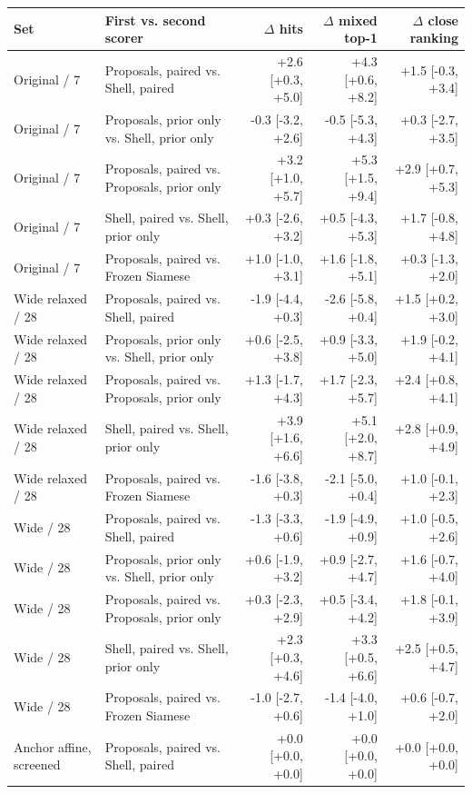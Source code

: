 \begin{tabular}{@{}llrrr@{}}
\toprule
Set & First vs. second scorer & $\Delta$ hits & $\Delta$ mixed top-1 & $\Delta$ close ranking \\
\midrule
Original / 7 & Proposals, paired vs. Shell, paired & +2.6 [+0.3, +5.0] & +4.3 [+0.6, +8.2] & +1.5 [-0.3, +3.4] \\
Original / 7 & Proposals, prior only vs. Shell, prior only & -0.3 [-3.2, +2.6] & -0.5 [-5.3, +4.3] & +0.3 [-2.7, +3.5] \\
Original / 7 & Proposals, paired vs. Proposals, prior only & +3.2 [+1.0, +5.7] & +5.3 [+1.5, +9.4] & +2.9 [+0.7, +5.3] \\
Original / 7 & Shell, paired vs. Shell, prior only & +0.3 [-2.6, +3.2] & +0.5 [-4.3, +5.3] & +1.7 [-0.8, +4.8] \\
Original / 7 & Proposals, paired vs. Frozen Siamese & +1.0 [-1.0, +3.1] & +1.6 [-1.8, +5.1] & +0.3 [-1.3, +2.0] \\
Wide relaxed / 28 & Proposals, paired vs. Shell, paired & -1.9 [-4.4, +0.3] & -2.6 [-5.8, +0.4] & +1.5 [+0.2, +3.0] \\
Wide relaxed / 28 & Proposals, prior only vs. Shell, prior only & +0.6 [-2.5, +3.8] & +0.9 [-3.3, +5.0] & +1.9 [-0.2, +4.1] \\
Wide relaxed / 28 & Proposals, paired vs. Proposals, prior only & +1.3 [-1.7, +4.3] & +1.7 [-2.3, +5.7] & +2.4 [+0.8, +4.1] \\
Wide relaxed / 28 & Shell, paired vs. Shell, prior only & +3.9 [+1.6, +6.6] & +5.1 [+2.0, +8.7] & +2.8 [+0.9, +4.9] \\
Wide relaxed / 28 & Proposals, paired vs. Frozen Siamese & -1.6 [-3.8, +0.3] & -2.1 [-5.0, +0.4] & +1.0 [-0.1, +2.3] \\
Wide / 28 & Proposals, paired vs. Shell, paired & -1.3 [-3.3, +0.6] & -1.9 [-4.9, +0.9] & +1.0 [-0.5, +2.6] \\
Wide / 28 & Proposals, prior only vs. Shell, prior only & +0.6 [-1.9, +3.2] & +0.9 [-2.7, +4.7] & +1.6 [-0.7, +4.0] \\
Wide / 28 & Proposals, paired vs. Proposals, prior only & +0.3 [-2.3, +2.9] & +0.5 [-3.4, +4.2] & +1.8 [-0.1, +3.9] \\
Wide / 28 & Shell, paired vs. Shell, prior only & +2.3 [+0.3, +4.6] & +3.3 [+0.5, +6.6] & +2.5 [+0.5, +4.7] \\
Wide / 28 & Proposals, paired vs. Frozen Siamese & -1.0 [-2.7, +0.6] & -1.4 [-4.0, +1.0] & +0.6 [-0.7, +2.0] \\
Anchor affine, screened & Proposals, paired vs. Shell, paired & +0.0 [+0.0, +0.0] & +0.0 [+0.0, +0.0] & +0.0 [+0.0, +0.0] \\

\end{tabular}
